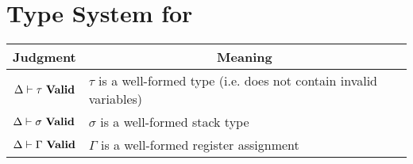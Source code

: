 \chapter{Type System for \ATAL}
\label{chap:types}

\begin{tabular}{|c|p{7.5 cm}|}
  \hline
  Judgment & \multicolumn{1}{|c|}{Meaning} \\\hline
  ${\Delta} |- {\tau}\ \mathbf{Valid}$ & $\tau$ is a well-formed type (i.e. does not contain invalid variables) \\
  ${\Delta} |- {\sigma}\ \mathbf{Valid}$ & $\sigma$ is a well-formed stack type \\
  ${\Delta} |- {\Gamma}\ \mathbf{Valid}$ & $\Gamma$ is a well-formed register assignment \\
\end{tabular}
